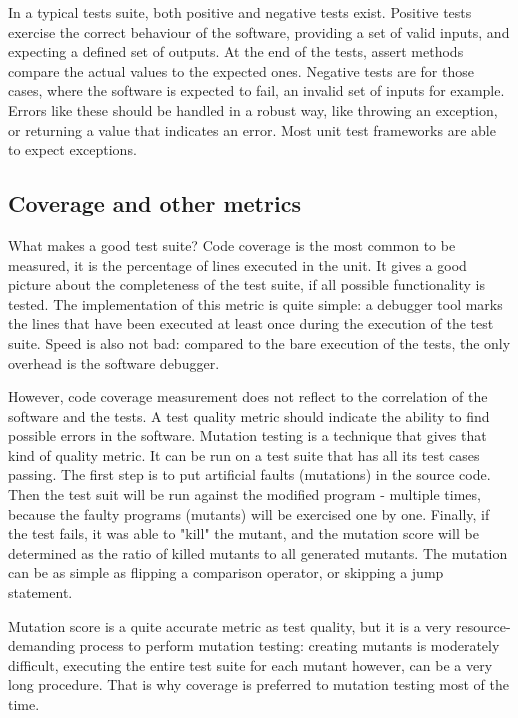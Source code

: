In a typical tests suite, both positive and negative tests exist. Positive tests exercise the correct behaviour of the software, providing a set of valid inputs, and expecting a defined set of outputs. At the end of the tests, assert methods compare the actual values to the expected ones. Negative tests are for those cases, where the software is expected to fail, an invalid set of inputs for example. Errors like these should be handled in a robust way, like throwing an exception, or returning a value that indicates an error. Most unit test frameworks are able to expect exceptions. \cite{Olan:2003:UTT:948785.948830}

\subsection{Coverage and other metrics}
What makes a good test suite? Code coverage is the most common to be measured, it is the percentage of lines executed in the unit. It gives a good picture about the completeness of the test suite, if all possible functionality is tested. The implementation of this metric is quite simple: a debugger tool marks the lines that have been executed at least once during the execution of the test suite. Speed is also not bad: compared to the bare execution of the tests, the only overhead is the software debugger.

However, code coverage measurement does not reflect to the correlation of the software and the tests. A test quality metric should indicate the ability to find possible errors in the software. Mutation testing is a technique that gives that kind of quality metric. It can be run on a test suite that has all its test cases passing. The first step is to put artificial faults (mutations) in the source code. Then the test suit will be run against the modified program - multiple times, because the faulty programs (mutants) will be exercised one by one. Finally, if the test fails, it was able to "kill" the mutant, and the mutation score will be determined as the ratio of killed mutants to all generated mutants. The mutation can be as simple as flipping a comparison operator, or skipping a jump statement. \cite{aron_mut}\cite{5487526}

Mutation score is a quite accurate metric as test quality, but it is a very resource-demanding process to perform mutation testing: creating mutants is moderately difficult, executing the entire test suite for each mutant however, can be a very long procedure. That is why coverage is preferred to mutation testing most of the time.

